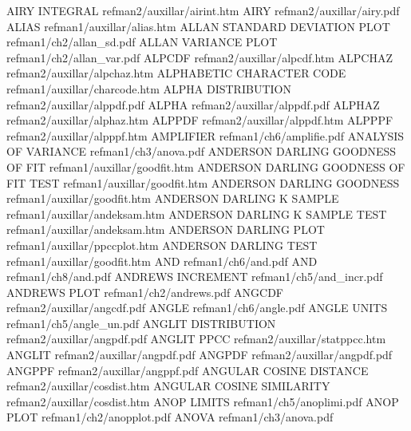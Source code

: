 AIRY INTEGRAL                           refman2/auxillar/airint.htm
AIRY                                    refman2/auxillar/airy.pdf
ALIAS                                   refman1/auxillar/alias.htm
ALLAN STANDARD DEVIATION PLOT           refman1/ch2/allan_sd.pdf
ALLAN VARIANCE PLOT                     refman1/ch2/allan_var.pdf
ALPCDF                                  refman2/auxillar/alpcdf.htm
ALPCHAZ                                 refman2/auxillar/alpchaz.htm
ALPHABETIC CHARACTER CODE               refman1/auxillar/charcode.htm
ALPHA DISTRIBUTION                      refman2/auxillar/alppdf.pdf
ALPHA                                   refman2/auxillar/alppdf.pdf
ALPHAZ                                  refman2/auxillar/alphaz.htm
ALPPDF                                  refman2/auxillar/alppdf.htm
ALPPPF                                  refman2/auxillar/alpppf.htm
AMPLIFIER                               refman1/ch6/amplifie.pdf
ANALYSIS OF VARIANCE                    refman1/ch3/anova.pdf
ANDERSON DARLING GOODNESS OF FIT        refman1/auxillar/goodfit.htm
ANDERSON DARLING GOODNESS OF FIT TEST   refman1/auxillar/goodfit.htm
ANDERSON DARLING GOODNESS               refman1/auxillar/goodfit.htm
ANDERSON DARLING K SAMPLE               refman1/auxillar/andeksam.htm
ANDERSON DARLING K SAMPLE TEST          refman1/auxillar/andeksam.htm
ANDERSON DARLING PLOT                   refman1/auxillar/ppccplot.htm
ANDERSON DARLING TEST                   refman1/auxillar/goodfit.htm
AND                                     refman1/ch6/and.pdf
AND                                     refman1/ch8/and.pdf
ANDREWS INCREMENT                       refman1/ch5/and_incr.pdf
ANDREWS PLOT                            refman1/ch2/andrews.pdf
ANGCDF                                  refman2/auxillar/angcdf.pdf
ANGLE                                   refman1/ch6/angle.pdf
ANGLE UNITS                             refman1/ch5/angle_un.pdf
ANGLIT DISTRIBUTION                     refman2/auxillar/angpdf.pdf
ANGLIT PPCC                             refman2/auxillar/statppcc.htm
ANGLIT                                  refman2/auxillar/angpdf.pdf
ANGPDF                                  refman2/auxillar/angpdf.pdf
ANGPPF                                  refman2/auxillar/angppf.pdf
ANGULAR COSINE DISTANCE                 refman2/auxillar/cosdist.htm
ANGULAR COSINE SIMILARITY               refman2/auxillar/cosdist.htm
ANOP LIMITS                             refman1/ch5/anoplimi.pdf
ANOP PLOT                               refman1/ch2/anopplot.pdf
ANOVA                                   refman1/ch3/anova.pdf
